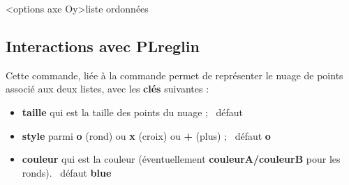 \documentclass{article}
\newcommand\ctex[1]{\tcbox[vignettelatex]{#1}}
\newcommand\Cle[1]{{\bfseries\sffamily\textlangle #1\textrangle}}
\begin{document}
\begin{codetex}
	\PLfenetre                %
	<options axe Oy>{liste ordonnées}
\end{codetex}

%

\subsection{Interactions avec PLreglin}

\begin{codetex}
\end{codetex}

\begin{codecles}
Cette commande, liée à la commande \ctex{PLreglin} permet de représenter le nuage de points associé aux deux listes, avec les \Cle{clés} suivantes :

\begin{itemize}
	\item \Cle{taille} qui est la taille des points du nuage ; \hfill~défaut \Cle{2pt}
	\item \Cle{style} parmi \Cle{o} (rond) ou \Cle{x} (croix) ou \Cle{+} (plus) ; \hfill~défaut \Cle{o}
	\item \Cle{couleur} qui est la couleur (éventuellement \Cle{couleurA/couleurB} pour les ronds). \hfill~défaut \Cle{blue}
\end{itemize}
\end{codecles}

\begin{codetex}
\def\LLX{1994,1995,1996,1997,1998,1999,2000,2001,2002,2004,2005,2006,2007,2008,2009,2010}
\def\LLY{1718,1710,1708,1700,1698,1697,1691,1688,1683,1679,1671,1670,1663,1661,1656,1649}

\begin{tikzpicture}[...]
	\PLnuagepts[couleur=blue/red]{\LLX}{\LLY}
\end{tikzpicture}
~~
\begin{tikzpicture}[...]
	\PLnuagepts[couleur=ForestGreen,style=x,taille=6pt]{\LLX}{\LLY}
\end{tikzpicture}
\end{codetex}
\end{document}
